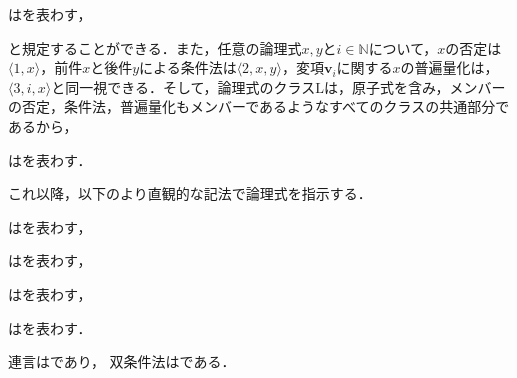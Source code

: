 \begin{df}
\label{df:原子式のクラス}
はを表わす，
\end{df}

\noindent と規定することができる．また，任意の論理式$x,y$と$i\in \mathbb{N}$について，$x$の否定は$\langle 1,x \rangle$，前件$x$と後件$y$による条件法は$ \langle 2,x,y \rangle $，変項$ \boldsymbol{v}_i $に関する$x$の普遍量化は，$\langle 3,i,x \rangle$と同一視できる．そして，論理式のクラス$\mathrm{L}$は，原子式を含み，メンバーの否定，条件法，普遍量化もメンバーであるようなすべてのクラスの共通部分であるから，

\begin{df}
\label{df:論理式のクラス}
はを表わす．
\end{df}

\noindent これ以降，以下のより直観的な記法で論理式を指示する．

\begin{df}[原子式]
\label{df:原子式}
はを表わす，
\end{df}

\begin{df}[否定]
\label{df:否定}
はを表わす，
\end{df}

\begin{df}[条件法]
\label{df:条件法}
はを表わす，
\end{df}

\begin{df}[普遍量化]
\label{df:普遍量化}
はを表わす．
\end{df}

\noindent 連言はであり，
双条件法はである．

